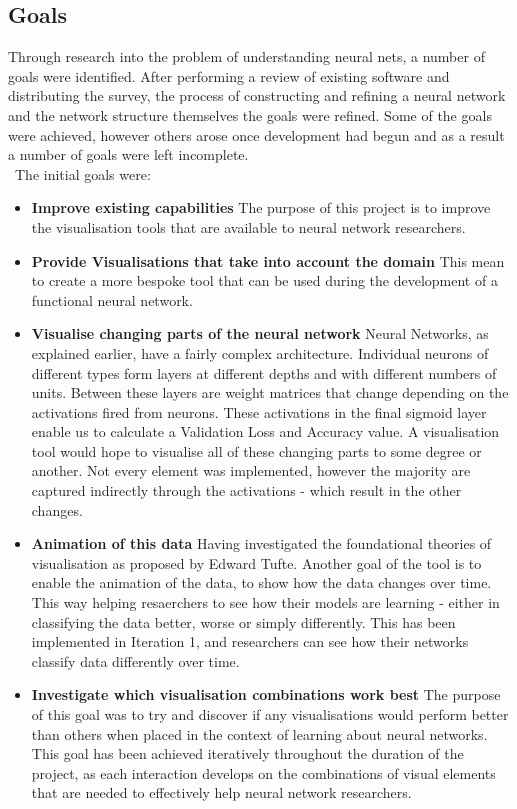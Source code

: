 \documentclass[a4paper,11pt,titlepage]{article}
\begin{document}
	\subsection{Goals}	
	Through research into the problem of understanding neural nets, a number of goals were identified. After performing a review of existing software and distributing the survey, the process of constructing and refining a neural network and the network structure themselves the goals were refined. Some of the goals were achieved, however others arose once development had begun and as a result a number of goals were left incomplete. 
\\\
The initial goals were:
	\begin{itemize}
		\item \textbf{Improve existing capabilities}
		The purpose of this project is to improve the visualisation tools that are available to neural network researchers.
		\item \textbf{Provide Visualisations that take into account the domain}
			 This mean to create a more bespoke tool that can be used during the development of a functional neural network.
		\item \textbf{Visualise changing parts of the neural network}
			 Neural Networks, as explained earlier, have a fairly complex architecture. Individual neurons of different types form layers at different depths and with different numbers of units. Between these layers are weight matrices that change depending on the activations fired from neurons. These activations in the final sigmoid layer enable us to calculate a Validation Loss and Accuracy value. A visualisation tool would hope to visualise all of these changing parts to some degree or another. Not every element was implemented, however the majority are captured indirectly through the activations - which result in the other changes.
			 \item \textbf{Animation of this data} Having investigated the foundational theories of visualisation as proposed by Edward Tufte. Another goal of the tool is to enable the animation of the data, to show how the data changes over time. This way helping resaerchers to see how their models are learning - either in classifying the data better, worse or simply differently. This has been implemented in Iteration 1, and researchers can see how their networks classify data differently over time.
			\item \textbf{Investigate which visualisation combinations work best}
			The purpose of this goal was to try and discover if any visualisations would perform better than others when placed in the context of learning about neural networks. This goal has been achieved iteratively throughout the duration of the project, as each interaction develops on the combinations of visual elements that are needed to effectively help neural network researchers.

\end{itemize}
\end{document}
